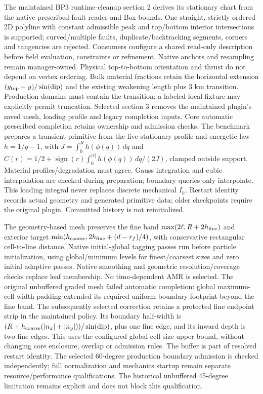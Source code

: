 \documentclass[11pt]{article}
\begin{document}
The maintained BP3 runtime-cleanup section 2 derives its stationary chart from
the native prescribed-fault reader and Box bounds. One straight, strictly ordered
2D polyline with constant admissible peak and top/bottom interior intersections
is supported; curved/multiple faults, duplicate/backtracking segments, corners
and tangencies are rejected. Consumers configure a shared read-only description
before field evaluation, constraints or refinement. Native anchors and resampling
remain manager-owned. Physical top-to-bottom orientation and thrust do not depend
on vertex ordering. Bulk material fractions retain the horizontal extension
$(y_{\rm top}-y)/\sin(\mathrm{dip})$ and the existing weakening length plus
3 km transition. Production domains must contain the transition; a labeled local
fixture may explicitly permit truncation. Selected section 3 removes the maintained
plugin's saved mesh, loading profile and legacy completion inputs. Core automatic
prescribed completion retains ownership and admission checks. The benchmark
prepares a transient primitive from the live stationary profile and energetic
law $h=1/g-1$, with $J=\int_0^R h(\phi(q))\,dq$ and
$C(r)=1/2+\operatorname{sign}(r)\int_0^{|r|}h(\phi(q))\,dq/(2J)$, clamped
outside support. Material profiles/degradation must agree. Gauss integration
and cubic interpolation are checked during preparation; boundary queries only
interpolate. This loading integral never replaces discrete mechanical $I_h$.
Restart identity records actual geometry and generated primitive data; older
checkpoints require the original plugin. Committed history is not reinitialized.

The geometry-based mesh preserves the fine band
$\max(2\ell,R+2h_{\rm fine})$ and exterior target
$\min(h_{\rm coarse},2h_{\rm fine}+(d-r_f)/4)$, with conservative rectangular
cell-to-line distance. Native initial-global tagging passes run before particle
initialization, using global/minimum levels for finest/coarsest sizes and zero
initial adaptive passes. Native smoothing and geometric resolution/coverage
checks replace leaf membership. No time-dependent AMR is selected.
The original unbuffered graded mesh failed automatic completion: global
maximum-cell-width padding extended its required uniform boundary footprint
beyond the fine band. The subsequently selected correction retains a protected
fine endpoint strip in the maintained policy. Its boundary half-width is
$(R+h_{\rm coarse}(|n_x|+|n_y|))/\sin(\mathrm{dip})$, plus one fine edge,
and its inward depth is two fine edges. This uses the configured global cell-size
upper bound, without changing core enclosure, overlap or admission rules.
The buffer is part of resolved restart identity. The selected 60-degree
production boundary admission is checked independently; full normalization
and mechanics startup remain separate resource/performance qualifications. The historical unbuffered
45-degree limitation remains explicit and does not block this qualification.
\end{document}
